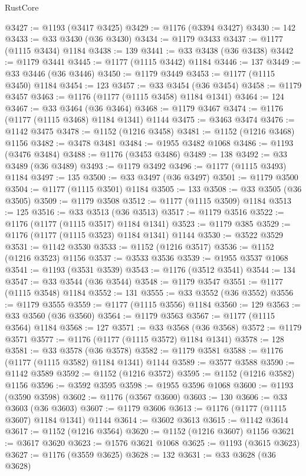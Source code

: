 \begin{lexlean}{RustCore}
\begin{coremodule}
@3427 := @1193 (@3417 @3425)
@3429 := @1176 (@3394 @3427)
@3430 := 142
@3433 := @33 @3430 (@36 @3430)
@3434 := @1179 @3433
@3437 := @1177 (@1115 @3434) @1184
@3438 := 139
@3441 := @33 @3438 (@36 @3438)
@3442 := @1179 @3441
@3445 := @1177 (@1115 @3442) @1184
@3446 := 137
@3449 := @33 @3446 (@36 @3446)
@3450 := @1179 @3449
@3453 := @1177 (@1115 @3450) @1184
@3454 := 123
@3457 := @33 @3454 (@36 @3454)
@3458 := @1179 @3457
@3463 := @1176 (@1177 (@1115 @3458) @1184 @1341)
@3464 := 124
@3467 := @33 @3464 (@36 @3464)
@3468 := @1179 @3467
@3474 := @1176 (@1177 (@1115 @3468) @1184 @1341) @1144
@3475 := @3463 @3474
@3476 := @1142 @3475
@3478 := @1152 (@1216 @3458)
@3481 := @1152 (@1216 @3468) @1156
@3482 := @3478 @3481
@3484 := @1955 @3482 @1068
@3486 := @1193 (@3476 @3484)
@3488 := @1176 (@3453 @3486)
@3489 := 138
@3492 := @33 @3489 (@36 @3489)
@3493 := @1179 @3492
@3496 := @1177 (@1115 @3493) @1184
@3497 := 135
@3500 := @33 @3497 (@36 @3497)
@3501 := @1179 @3500
@3504 := @1177 (@1115 @3501) @1184
@3505 := 133
@3508 := @33 @3505 (@36 @3505)
@3509 := @1179 @3508
@3512 := @1177 (@1115 @3509) @1184
@3513 := 125
@3516 := @33 @3513 (@36 @3513)
@3517 := @1179 @3516
@3522 := @1176 (@1177 (@1115 @3517) @1184 @1341)
@3523 := @1179 @385
@3529 := @1176 (@1177 (@1115 @3523) @1184 @1341) @1144
@3530 := @3522 @3529
@3531 := @1142 @3530
@3533 := @1152 (@1216 @3517)
@3536 := @1152 (@1216 @3523) @1156
@3537 := @3533 @3536
@3539 := @1955 @3537 @1068
@3541 := @1193 (@3531 @3539)
@3543 := @1176 (@3512 @3541)
@3544 := 134
@3547 := @33 @3544 (@36 @3544)
@3548 := @1179 @3547
@3551 := @1177 (@1115 @3548) @1184
@3552 := 131
@3555 := @33 @3552 (@36 @3552)
@3556 := @1179 @3555
@3559 := @1177 (@1115 @3556) @1184
@3560 := 129
@3563 := @33 @3560 (@36 @3560)
@3564 := @1179 @3563
@3567 := @1177 (@1115 @3564) @1184
@3568 := 127
@3571 := @33 @3568 (@36 @3568)
@3572 := @1179 @3571
@3577 := @1176 (@1177 (@1115 @3572) @1184 @1341)
@3578 := 128
@3581 := @33 @3578 (@36 @3578)
@3582 := @1179 @3581
@3588 := @1176 (@1177 (@1115 @3582) @1184 @1341) @1144
@3589 := @3577 @3588
@3590 := @1142 @3589
@3592 := @1152 (@1216 @3572)
@3595 := @1152 (@1216 @3582) @1156
@3596 := @3592 @3595
@3598 := @1955 @3596 @1068
@3600 := @1193 (@3590 @3598)
@3602 := @1176 (@3567 @3600)
@3603 := 130
@3606 := @33 @3603 (@36 @3603)
@3607 := @1179 @3606
@3613 := @1176 (@1177 (@1115 @3607) @1184 @1341) @1144
@3614 := @3602 @3613
@3615 := @1142 @3614
@3617 := @1152 (@1216 @3564)
@3620 := @1152 (@1216 @3607) @1156
@3621 := @3617 @3620
@3623 := @1576 @3621 @1068
@3625 := @1193 (@3615 @3623)
@3627 := @1176 (@3559 @3625)
@3628 := 132
@3631 := @33 @3628 (@36 @3628)

\end{coremodule}
\end{lexlean}
